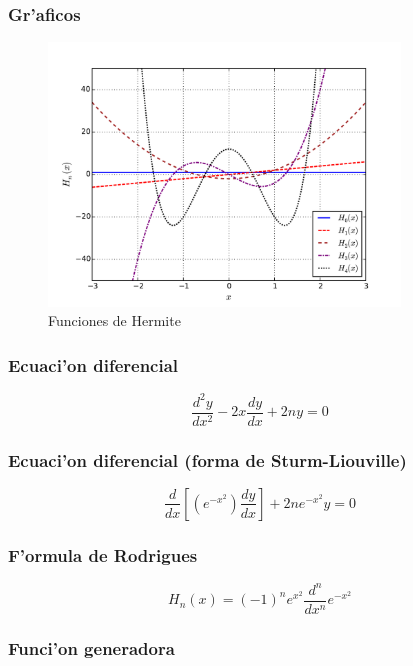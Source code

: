 \subsubsection{Gr'aficos}
\begin{figure}[!h]
\centerline{\includegraphics[height=7cm]{figs/fig-Hermite.pdf}}
\caption{Funciones de Hermite}
\end{figure}

\subsubsection{Ecuaci'on diferencial}

\begin{equation}
\frac{d^{2}y}{dx^{2}}-2x\frac{dy}{dx}+2ny=0
\end{equation}

\subsubsection{Ecuaci'on diferencial (forma de Sturm-Liouville)}

\begin{equation}
\frac{d}{dx}\left[\left( e^{-x^{2}}\right)\frac{dy}{dx}\right]+2ne^{-x^{2}}y=0
\end{equation}

\subsubsection{F'ormula de Rodrigues}

\begin{equation}
H_{n}(x)=(-1)^{n}e^{x^{2}}\frac{d^{n}}{dx^{n}}e^{-x^{2}}
\end{equation}

\subsubsection{Funci'on generadora}

